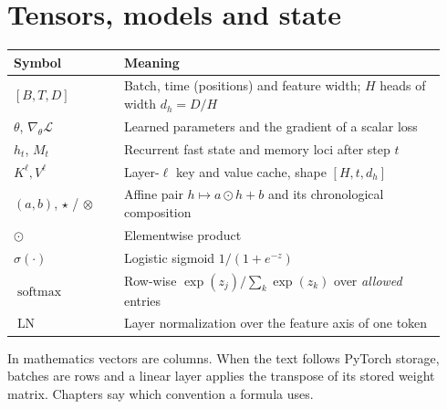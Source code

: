 \section{Tensors, models and state}
\begin{center}\small
\begin{tabular}{@{}P{0.24\linewidth}P{0.70\linewidth}@{}}
\toprule
Symbol & Meaning\\\midrule
$[B,T,D]$ & Batch, time (positions) and feature width; $H$ heads of width $d_h=D/H$\\
$\theta$, $\nabla_\theta\mathcal L$ & Learned parameters and the gradient of a scalar loss\\
$h_t$, $M_t$ & Recurrent fast state and memory loci after step $t$\\
$K^\ell,V^\ell$ & Layer-$\ell$ key and value cache, shape $[H,t,d_h]$\\
$(a,b)$, $\star$ / $\otimes$ & Affine pair $h\mapsto a\odot h+b$ and its chronological composition\\
$\odot$ & Elementwise product\\
$\sigma(\cdot)$ & Logistic sigmoid $1/(1+e^{-z})$\\
$\operatorname{softmax}$ & Row-wise $\exp(z_j)/\sum_k\exp(z_k)$ over \emph{allowed} entries\\
$\operatorname{LN}$ & Layer normalization over the feature axis of one token\\
\bottomrule
\end{tabular}
\end{center}
In mathematics vectors are columns. When the text follows PyTorch storage, batches are
rows and a linear layer applies the transpose of its stored weight matrix. Chapters say
which convention a formula uses.

